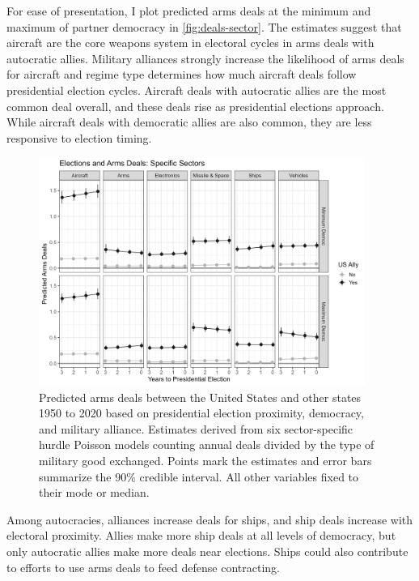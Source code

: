 \documentclass[12pt]{article}
\begin{document}
For ease of presentation, I plot predicted arms deals at the minimum and maximum of partner democracy in \autoref{fig:deals-sector}.
The estimates suggest that aircraft are the core weapons system in electoral cycles in arms deals with autocratic allies. 
Military alliances strongly increase the likelihood of arms deals for aircraft and regime type determines how much aircraft deals follow presidential election cycles. 
Aircraft deals with autocratic allies are the most common deal overall, and these deals rise as presidential elections approach. 
While aircraft deals with democratic allies are also common, they are less responsive to election timing. 



\begin{figure}[htpb]
	\centering
		\includegraphics[width=0.95\textwidth]{../figures/deals-sector.png}
	\caption{Predicted arms deals between the United States and other states 1950 to 2020 based on presidential election proximity, democracy, and military alliance. Estimates derived from six sector-specific hurdle Poisson models counting annual deals divided by the type of military good exchanged. Points mark the estimates and error bars summarize the 90\% credible interval. All other variables fixed to their mode or median.}
	\label{fig:deals-sector}
\end{figure}


Among autocracies, alliances increase deals for ships, and ship deals increase with electoral proximity. 
Allies make more ship deals at all levels of democracy, but only autocratic allies make more deals near elections. 
Ships could also contribute to efforts to use arms deals to feed defense contracting. 
\end{document}
